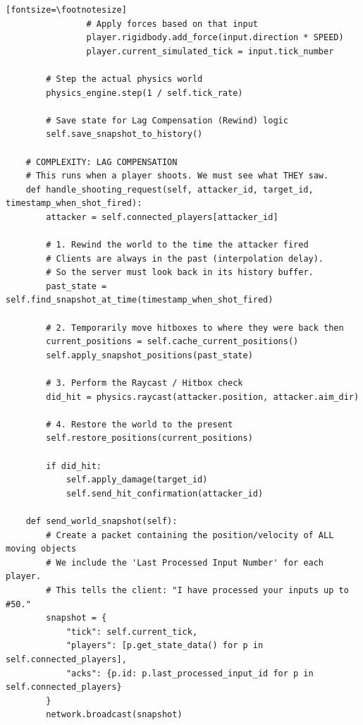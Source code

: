 \documentclass{article}
\begin{document}
\begin{verbatim}[fontsize=\footnotesize]
                # Apply forces based on that input
                player.rigidbody.add_force(input.direction * SPEED)
                player.current_simulated_tick = input.tick_number

        # Step the actual physics world
        physics_engine.step(1 / self.tick_rate)

        # Save state for Lag Compensation (Rewind) logic
        self.save_snapshot_to_history()

    # COMPLEXITY: LAG COMPENSATION
    # This runs when a player shoots. We must see what THEY saw.
    def handle_shooting_request(self, attacker_id, target_id, timestamp_when_shot_fired):
        attacker = self.connected_players[attacker_id]

        # 1. Rewind the world to the time the attacker fired
        # Clients are always in the past (interpolation delay).
        # So the server must look back in its history buffer.
        past_state = self.find_snapshot_at_time(timestamp_when_shot_fired)

        # 2. Temporarily move hitboxes to where they were back then
        current_positions = self.cache_current_positions()
        self.apply_snapshot_positions(past_state)

        # 3. Perform the Raycast / Hitbox check
        did_hit = physics.raycast(attacker.position, attacker.aim_dir)

        # 4. Restore the world to the present
        self.restore_positions(current_positions)

        if did_hit:
            self.apply_damage(target_id)
            self.send_hit_confirmation(attacker_id)

    def send_world_snapshot(self):
        # Create a packet containing the position/velocity of ALL moving objects
        # We include the 'Last Processed Input Number' for each player.
        # This tells the client: "I have processed your inputs up to #50."
        snapshot = {
            "tick": self.current_tick,
            "players": [p.get_state_data() for p in self.connected_players],
            "acks": {p.id: p.last_processed_input_id for p in self.connected_players}
        }
        network.broadcast(snapshot)
\end{verbatim}
\end{document}
